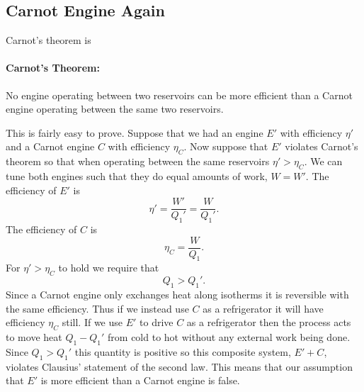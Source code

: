 \documentclass[a4paper]{article}
\begin{document}
    \subsection{Carnot Engine Again}
    Carnot's theorem is
    \paragraph{Carnot's Theorem:} No engine operating between two reservoirs can be more efficient than a Carnot engine operating between the same two reservoirs.
    
    This is fairly easy to prove.
    Suppose that we had an engine \(E'\) with efficiency \(\eta'\) and a Carnot engine \(C\) with efficiency \(\eta_C\).
    Now suppose that \(E'\) violates Carnot's theorem so that when operating between the same reservoirs \(\eta' > \eta_C\).
    We can tune both engines such that they do equal amounts of work, \(W = W'\).
    The efficiency of \(E'\) is
    \[\eta' = \frac{W'}{Q_1'} = \frac{W}{Q_1'}.\]
    The efficiency of \(C\) is
    \[\eta_C = \frac{W}{Q_1}.\]
    For \(\eta' > \eta_C\) to hold we require that
    \[Q_1 > Q_1'.\]
    Since a Carnot engine only exchanges heat along isotherms it is reversible with the same efficiency.
    Thus if we instead use \(C\) as a refrigerator it will have efficiency \(\eta_C\) still.
    If we use \(E'\) to drive \(C\) as a refrigerator then the process acts to move heat \(Q_1 - Q_1'\) from cold to hot without any external work being done.
    Since \(Q_1 > Q_1'\) this quantity is positive so this composite system, \(E' + C\), violates Clausius' statement of the second law.
    This means that our assumption that \(E'\) is more efficient than a Carnot engine is false.
    
\end{document}
